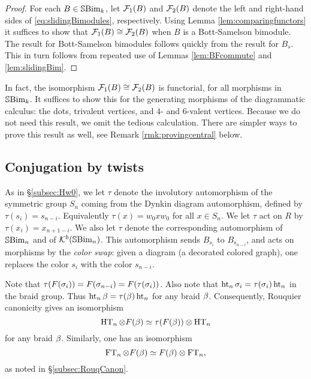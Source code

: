\begin{proof} For each $B\in{\mathbb{S}}{\rm Bim }_k$, let ${\mathcal{F}}_1(B)$ and ${\mathcal{F}}_2(B)$ denote the left and right-hand sides of \eqref{eq:slidingBimodules}, respectively. Using Lemma
\ref{lem:comparingfunctors} it suffices to show that ${\mathcal{F}}_1(B) \cong {\mathcal{F}}_2(B)$ when $B$ is a Bott-Samelson bimodule. The result for Bott-Samelson bimodules follows quickly from the
result for $B_s$. This in turn follows from repeated use of Lemmas \ref{lem:BFcommute} and \ref{lem:slidingBim}. \end{proof}
	
\begin{remark} In fact, the isomorphism ${\mathcal{F}}_1(B) \cong {\mathcal{F}}_2(B)$ is functorial, for all morphisms in ${\mathbb{S}}{\rm Bim }_k$. It suffices to show this for the generating morphisms of the diagrammatic
calculus: the dots, trivalent vertices, and $4$- and $6$-valent vertices. Because we do not need this result, we omit the tedious calculation. There are simpler ways to prove this result
as well, see Remark \ref{rmk:provingcentral} below. \end{remark}

\subsection{Conjugation by twists}
\label{subsec:commutehalffull}

\begin{defn} As in \S\ref{subsec:Hw0}, we let $\tau$ denote the involutory automorphism of the symmetric group $S_n$ coming from the Dynkin diagram automorphism, defined by
$\tau(s_i)=s_{n-i}$. Equivalently $\tau(x) = w_0xw_0$ for all $x\in S_n$. We let $\tau$ act on $R$ by $\tau(x_i) = x_{n+1-i}$. We also let $\tau$ denote the
corresponding automorphism of ${\mathbb{S}}{\rm Bim }_n$ and of ${\mathcal{K}}^b({\mathbb{S}}{\rm Bim }_n)$. This automorphism sends $B_{s_i}$ to $B_{s_{n-i}}$, and acts on morphisms by the \emph{color swap}: given a diagram (a
decorated colored graph), one replaces the color $s_i$ with the color $s_{n-i}$. \end{defn}

Note that $\tau(F(\sigma_i)) = F(\sigma_{n-i}) = F(\tau(\sigma_i))$. Also note that $\operatorname{ht}_n \sigma_i = \tau(\sigma_i) \operatorname{ht}_n$ in the braid group. Thus $\operatorname{ht}_n \beta = \tau(\beta) \operatorname{ht}_n$ for any braid $\beta$.
Consequently, Rouquier canonicity gives an isomorphism \begin{equation} \operatorname{HT}_n \otimes F(\beta) \simeq \tau(F(\beta)) \otimes \operatorname{HT}_n\end{equation} for any braid $\beta$. Similarly, one has an isomorphism
\begin{equation} \operatorname{FT}_n \otimes F(\beta) \simeq F(\beta) \otimes \operatorname{FT}_n, \end{equation} as noted in \S\ref{subsec:RouqCanon}.
	
